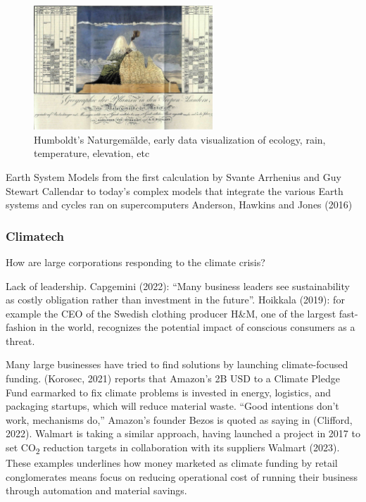 \documentclass[
  letterpaper,
  DIV=11,
  numbers=noendperiod]{scrartcl}
\begin{document}
\begin{figure}[H]

{\centering \includegraphics[width=0.6\textwidth,height=\textheight]{./images/humboldt.jpg}

}

\caption{Humboldt's Naturgemälde, early data visualization of ecology,
rain, temperature, elevation, etc}

\end{figure}%

Earth System Models from the first calculation by Svante Arrhenius and
Guy Stewart Callendar to today's complex models that integrate the
various Earth systems and cycles ran on supercomputers Anderson, Hawkins
and Jones (2016)

\subsubsection{Climatech}\label{climatech}

How are large corporations responding to the climate crisis?

Lack of leadership. Capgemini (2022): ``Many business leaders see
sustainability as costly obligation rather than investment in the
future''. Hoikkala (2019): for example the CEO of the Swedish clothing
producer H\&M, one of the largest fast-fashion in the world, recognizes
the potential impact of conscious consumers as a threat.

Many large businesses have tried to find solutions by launching
climate-focused funding. (Korosec, 2021) reports that Amazon's 2B USD to
a Climate Pledge Fund earmarked to fix climate problems is invested in
energy, logistics, and packaging startups, which will reduce material
waste. ``Good intentions don't work, mechanisms do,'' Amazon's founder
Bezos is quoted as saying in (Clifford, 2022). Walmart is taking a
similar approach, having launched a project in 2017 to set
CO\textsubscript{2} reduction targets in collaboration with its
suppliers Walmart (2023). These examples underlines how money marketed
as climate funding by retail conglomerates means focus on reducing
operational cost of running their business through automation and
material savings.
\end{document}

